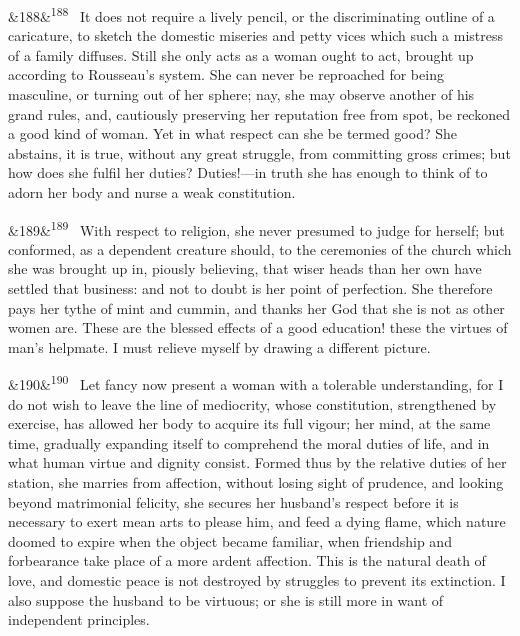 \documentclass[12pt]{article}
\newcommand{\para}[1][]{\par\noindent\ifx&#1&\else\textsuperscript{\footnotesize #1}~\fi}
\begin{document}
\para[188] It does not require a lively pencil, or the discriminating outline of a caricature, to sketch the domestic miseries and petty vices which such a mistress of a family diffuses. Still she only acts as a woman ought to act, brought up according to Rousseau's system. She can never be reproached for being masculine, or turning out of her sphere; nay, she may observe another of his grand rules, and, cautiously preserving her reputation free from spot, be reckoned a good kind of woman. Yet in what respect can she be termed good? She abstains, it is true, without any great struggle, from committing gross crimes; but how does she fulfil her duties? Duties!---in truth she has enough to think of to adorn her body and nurse a weak constitution.

\para[189] With respect to religion, she never presumed to judge for herself; but conformed, as a dependent creature should, to the ceremonies of the church which she was brought up in, piously believing, that wiser heads than her own have settled that business: and not to doubt is her point of perfection. She therefore pays her tythe of mint and cummin, and thanks her God that she is not as other women are. These are the blessed effects of a good education! these the virtues of man's helpmate. I must relieve myself by drawing a different picture.

\para[190] Let fancy now present a woman with a tolerable understanding, for I do not wish to leave the line of mediocrity, whose constitution, strengthened by exercise, has allowed her body to acquire its full vigour; her mind, at the same time, gradually expanding itself to comprehend the moral duties of life, and in what human virtue and dignity consist. Formed thus by the relative duties of her station, she marries from affection, without losing sight of prudence, and looking beyond matrimonial felicity, she secures her husband's respect before it is necessary to exert mean arts to please him, and feed a dying flame, which nature doomed to expire when the object became familiar, when friendship and forbearance take place of a more ardent affection. This is the natural death of love, and domestic peace is not destroyed by struggles to prevent its extinction. I also suppose the husband to be virtuous; or she is still more in want of independent principles.
\end{document}
